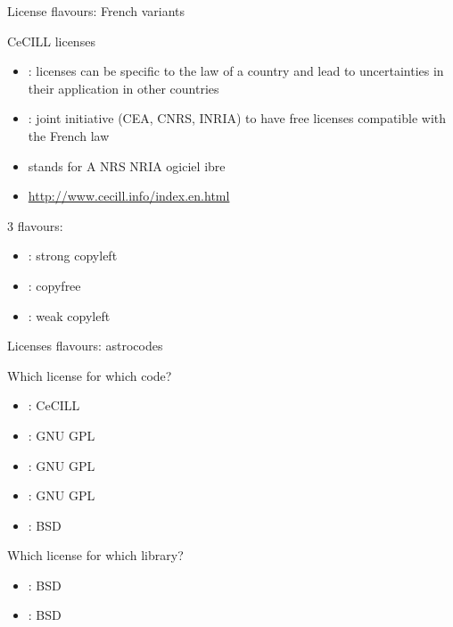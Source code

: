 \documentclass[10pt,xcolor=svgnames]{beamer}
\begin{document}
\begin{frame}{License flavours: French variants}

  \begin{block}{CeCILL licenses}
    \begin{itemize}
      \item {}: licenses can be specific to the law of a country and lead to uncertainties in their application in other countries
      \item {}: joint initiative (CEA, CNRS, INRIA) to have free licenses compatible with the French law
      \item {} stands for A NRS NRIA ogiciel ibre
      \item \url{http://www.cecill.info/index.en.html}
    \end{itemize}
  \end{block}

  \begin{block}{3 flavours:}
    \begin{itemize}
      \item {}: strong copyleft
      \item {}: copyfree
      \item {}: weak copyleft
    \end{itemize}
  \end{block}

\end{frame}

\begin{frame}{Licenses flavours: astrocodes}

  \begin{block}{Which license for which code?}
    \begin{itemize}
      \item {}: CeCILL
      \item {}: GNU GPL
      \item {}: GNU GPL
      \item {}: GNU GPL
      \item {}: BSD
    \end{itemize}
  \end{block}

  \begin{block}{Which license for which library?}
    \begin{itemize}
      \item {}: BSD
      \item {}: BSD
    \end{itemize}
  \end{block}

\end{frame}
\end{document}
